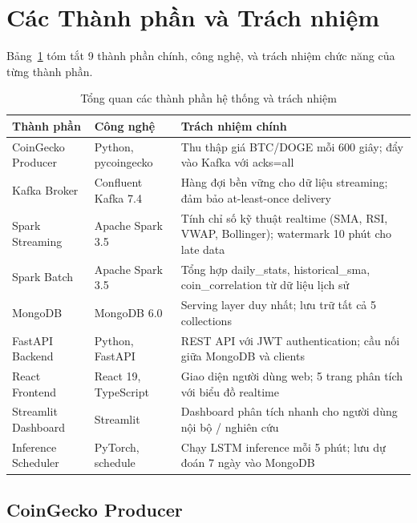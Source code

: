 \documentclass[12pt, a4paper]{article}
\begin{document}
\section{Các Thành phần và Trách nhiệm}

Bảng~\ref{tab:components} tóm tắt 9 thành phần chính, công nghệ, và trách nhiệm
chức năng của từng thành phần.

\begin{table}[H]
  \centering
  \caption{Tổng quan các thành phần hệ thống và trách nhiệm}
  \label{tab:components}
  \begin{tabularx}{\textwidth}{lXX}
    \toprule
    Thành phần & Công nghệ & Trách nhiệm chính \\
    \midrule
    CoinGecko Producer & Python, pycoingecko & Thu thập giá BTC/DOGE mỗi 600 giây;
      đẩy vào Kafka với acks=all \\
    Kafka Broker & Confluent Kafka 7.4 & Hàng đợi bền vững cho dữ liệu streaming;
      đảm bảo at-least-once delivery \\
    Spark Streaming & Apache Spark 3.5 & Tính chỉ số kỹ thuật realtime (SMA, RSI,
      VWAP, Bollinger); watermark 10 phút cho late data \\
    Spark Batch & Apache Spark 3.5 & Tổng hợp daily\_stats, historical\_sma,
      coin\_correlation từ dữ liệu lịch sử \\
    MongoDB & MongoDB 6.0 & Serving layer duy nhất; lưu trữ tất cả 5 collections \\
    FastAPI Backend & Python, FastAPI & REST API với JWT authentication;
      cầu nối giữa MongoDB và clients \\
    React Frontend & React 19, TypeScript & Giao diện người dùng web; 5 trang phân
      tích với biểu đồ realtime \\
    Streamlit Dashboard & Streamlit & Dashboard phân tích nhanh cho người dùng
      nội bộ / nghiên cứu \\
    Inference Scheduler & PyTorch, schedule & Chạy LSTM inference mỗi 5 phút;
      lưu dự đoán 7 ngày vào MongoDB \\
    \bottomrule
  \end{tabularx}
\end{table}

\subsection{CoinGecko Producer}
\end{document}
